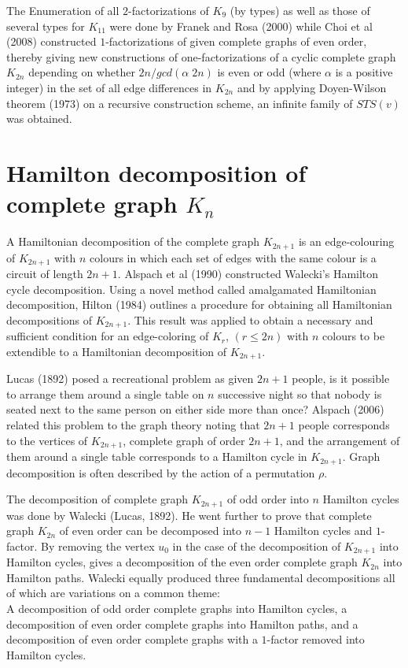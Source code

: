 \documentclass[12pt]{report}
\begin{document}
The Enumeration of all $2$-factorizations of $K_9$ (by types) as
well as those of several types for $K_{11}$ were done by Franek and
Rosa  (2000) while
Choi et al (2008)  %
constructed $1$-factorizations of given complete graphs of even
order, thereby giving new constructions of one-factorizations of a
cyclic complete graph $K_{2n}$ depending on whether $2n / gcd(\alpha
\; 2n)$ is even or odd (where $\alpha$ is a positive integer) in the
set of all edge differences in $K_{2n}$ and by applying Doyen-Wilson
theorem (1973) %
on a recursive construction scheme, an infinite family of $STS(v)$
was obtained.
 \section{\protect\smallskip Hamilton decomposition of complete graph $K_n$}
 A Hamiltonian decomposition of the complete graph $K_{2n+1}$ is an edge-colouring of $K_{2n+1}$ with
$n$ colours in which each set of edges with the same colour is a
circuit of length $2n+1$. Alspach et al (1990) %
constructed Walecki's Hamilton cycle decomposition. Using a
novel method called amalgamated Hamiltonian decomposition, Hilton (1984) %
outlines a procedure for obtaining all Hamiltonian decompositions of
$K_{2n+1}$. This result was applied to obtain a necessary and
sufficient condition for an edge-coloring of $K_r $, $(r \leq 2n)$
with $n$ colours to be extendible to a Hamiltonian decomposition of
$K_{2n+1}$.

Lucas (1892) %
posed a recreational problem as given $2n+1$ people, is it possible to arrange them around a single table on $n$ successive night  so that nobody is seated next to the same person on either side more than once?  Alspach (2006) %
related this problem to the graph theory noting that $2n+1$ people
corresponds to the vertices of $K_{2n+1}$, complete graph of order
$2n+1$, and the arrangement of them around a single table
corresponds to a Hamilton cycle in $K_{2n+1}$. Graph decomposition
is often described by the action of a permutation $\rho$.

The decomposition of complete graph $K_{2n+1}$ of odd order into $n$
Hamilton cycles was done by Walecki (Lucas, 1892). He went further to prove that
complete graph $K_{2n}$ of even order can be decomposed into $n-1$
Hamilton cycles and $1$-factor. By removing the vertex $u_0$ in the
case of the decomposition of $K_{2n+1}$ into Hamilton cycles, gives
a decomposition of the even order complete graph $K_{2n}$ into
Hamilton paths. Walecki equally produced three fundamental
decompositions all of which are variations on a common theme:\\
 A decomposition of odd order complete graphs into Hamilton cycles, a
decomposition of even order complete graphs into Hamilton paths, and
a decomposition of even order complete graphs with a $1$-factor
removed into Hamilton cycles.
\end{document}

